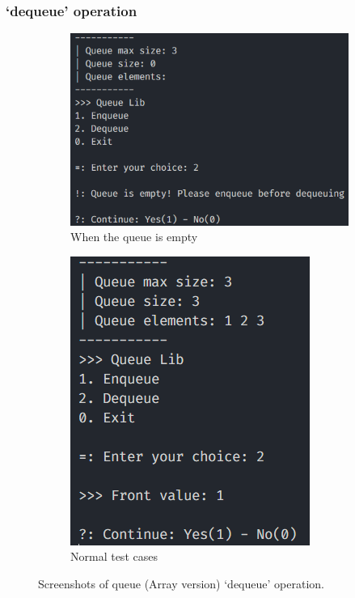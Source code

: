 \subsubsection*{`dequeue' operation}
\begin{figure}[!ht]
	\centering
	\begin{subfigure}{0.6\textwidth}
		\centering
		\includegraphics[width=\textwidth]{imgs/QueueArray/pop/empty.png}
		\caption{When the queue is empty}\label{fig:queue_arr_pop_empty}
	\end{subfigure}
	\hfill
	\begin{subfigure}{0.34\textwidth}
		\centering
		\includegraphics[width=\textwidth]{imgs/QueueArray/pop/normal.png}
		\caption{Normal test cases}\label{fig:queue_arr_pop_normal}
	\end{subfigure}
	\caption{Screenshots of queue (Array version) `dequeue' operation.}\label{fig:queue_arr_pop_cases}
\end{figure}

